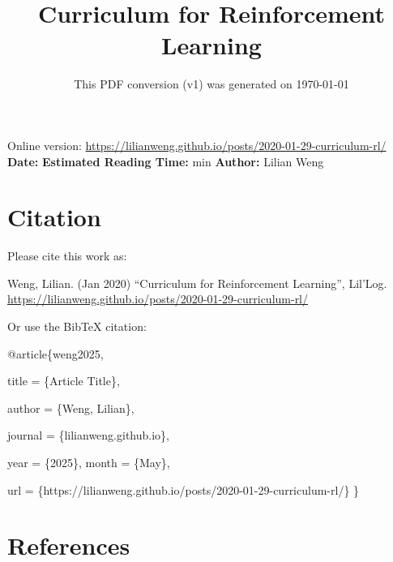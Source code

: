 \documentclass[12pt]{article}
\title{Curriculum for Reinforcement Learning}
\date{This PDF conversion (v1) was generated on \today\footnotemark}
\begin{document}
\maketitle
\begin{center}
    Online version: \url{https://lilianweng.github.io/posts/2020-01-29-curriculum-rl/} \\
    \textbf{Date:} \quad
    \textbf{Estimated Reading Time:}  min \quad
    \textbf{Author:} Lilian Weng
\end{center}




\newpage
\tableofcontents
\newpage
\vspace{1em}
\n\n\n\section{Citation}
Please cite this work as:

\begin{tcolorbox}[colback=black!5!white, colframe=black!80!white, boxrule=0.5pt, arc=2mm, left=1mm, right=1mm, top=1mm, bottom=1mm]
  Weng, Lilian. (Jan 2020) ``Curriculum for Reinforcement Learning'', Lil'Log. \url{https://lilianweng.github.io/posts/2020-01-29-curriculum-rl/}
  \end{tcolorbox}

Or use the BibTeX citation:

\begin{tcolorbox}[
    colback=black!5!white,
    colframe=black!80!white,
    boxrule=0.5pt,
    arc=2mm,
    left=1mm,
    right=1mm,
    top=1mm,
    bottom=1mm,
    listing only,
    listing options={
      basicstyle=\ttfamily\footnotesize,
      breaklines=true,
      literate={\{}{{\char`\{}}1 {\}}{{\char`\}}}1
    }
  ]
  @article\{weng2025,

    title   = \{Article Title\},

    author  = \{Weng, Lilian\},

    journal = \{lilianweng.github.io\},

    year    = \{2025\},
    month   = \{May\},

    url     = \{https://lilianweng.github.io/posts/2020-01-29-curriculum-rl/\}\n
  \}
  \end{tcolorbox}

\newpage
\section{References}

\n
\end{document}
